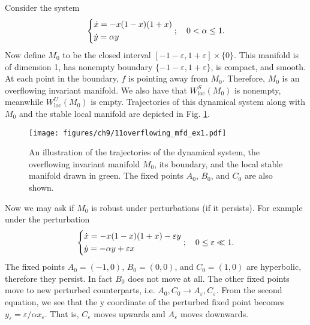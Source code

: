 \begin{ex}[]
	Consider the system
	\begin{align}
		\begin{dcases}
			\dot{x}= -x(1-x)(1+x) \\
			\dot{y} = \alpha y
		\end{dcases}
		;\quad 0 < \alpha \leq 1.
	\end{align}
	Now define $M_0$ to be the closed interval $[-1-\varepsilon, 1 + \varepsilon]\times \{0\}$. This manifold is of dimension 1, has nonempty boundary $\{-1-\varepsilon, 1+\varepsilon\}$, is compact, and smooth. At each point in the boundary, $f$ is pointing away from $M_0$. Therefore, $M_0$ is an overflowing invariant manifold. We also have that $W^{S}_{ \textrm{loc}}(M_0)$ is nonempty, meanwhile $W^{U}_{ \textrm{loc} }(M_0)$ is empty. Trajectories of this dynamical system along with $M_0$ and the stable local manifold are depicted in Fig. \ref{fig:overflowing_mfd_ex1}.
	\begin{figure}[h!]
		\centering
		\texttt{[image: figures/ch9/11overflowing\_mfd\_ex1.pdf]}
		\caption{An illustration of the trajectories of the dynamical system, the overflowing invariant manifold $M_0$, its boundary, and the local stable manifold drawn in green. The fixed points $A_0$, $B_0$, and $C_0$ are also shown.}
		\label{fig:overflowing_mfd_ex1}
	\end{figure}

	Now we may ask if $M_0$ is robust under perturbations (if it persists). For example under the perturbation
	\begin{align}
		\begin{dcases}
			\dot{x} = -x(1-x)(1+x) -\varepsilon y \\
			\dot{y} = - \alpha y + \varepsilon x
		\end{dcases}
		;\quad 0 \leq \varepsilon \ll 1.
	\end{align}
	The fixed points $A_0=(-1,0)$, $B_0=(0,0)$, and $C_0=(1,0)$ are hyperbolic, therefore they persist. In fact $B_0$ does not move at all. The other fixed points move to new perturbed counterparts, i.e. $A_0,C_0 \to A_{\varepsilon}, C_{\varepsilon}$. From the second equation, we see that the y coordinate of the perturbed fixed point becomes $y_\varepsilon= \varepsilon/\alpha x_\varepsilon$. That is, $C_\varepsilon$ moves upwards and $A_\varepsilon$ moves downwards.


\end{ex}
